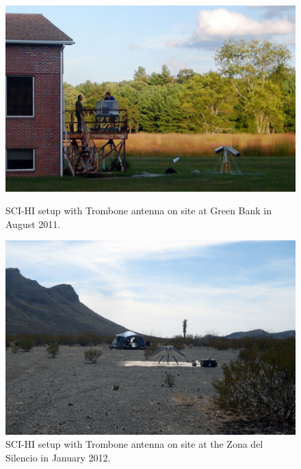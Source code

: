 \begin{figure}[htb]
\centering
\begin{minipage}[b]{0.48\textwidth}
\centering
\includegraphics[width=0.95\linewidth]{SCIHI_system/figures/trombone_gbt.jpg}
\caption{SCI-HI setup with Trombone antenna on site at Green Bank in August 2011.}
\label{Fig:trombone_gbt}
\end{minipage}%
\begin{minipage}[b]{0.02\textwidth}
\hspace{1cm}
\end{minipage}%
\begin{minipage}[b]{0.45\textwidth}
\centering
\includegraphics[width=0.95\linewidth]{SCIHI_system/figures/trombone_sys_ZdS.jpg}
\caption{SCI-HI setup with Trombone antenna on site at the Zona del Silencio in January 2012.}
\label{Fig:trombone_zds}
\end{minipage}
\end{figure}

